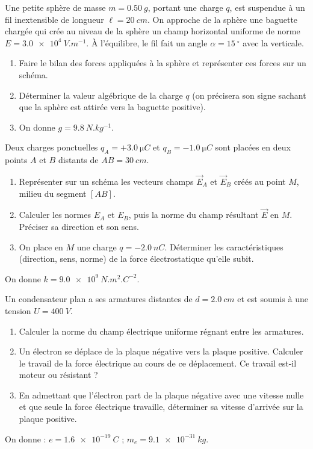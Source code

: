 \documentclass[11pt]{article}
\providecommand{\degree}{^{\circ}}
\newcounter{popsec}
\newcounter{popsub}
\newcommand{\courssub}[1]{%
  \stepcounter{popsub}%
  \par\vspace{9pt}\noindent{\popxbold\fontsize{11.5}{13}\selectfont\color{popink}{\color{poporange}\thepopsec.\thepopsub}\hspace{6pt}#1}\par\nopagebreak\vspace{4pt}
}
\begin{document}
\courssub{Je m'entraîne}

\begin{exercice}
Une petite sphère de masse $m = \SI{0,50}{g}$, portant une charge $q$, est suspendue à un fil inextensible de longueur $\ell = \SI{20}{cm}$. On approche de la sphère une baguette chargée qui crée au niveau de la sphère un champ horizontal uniforme de norme $E = \SI{3,0e4}{V.m^{-1}}$. À l'équilibre, le fil fait un angle $\alpha = \SI{15}{\degree}$ avec la verticale.
\begin{enumerate}
\item Faire le bilan des forces appliquées à la sphère et représenter ces forces sur un schéma.
\item Déterminer la valeur algébrique de la charge $q$ (on précisera son signe sachant que la sphère est attirée vers la baguette positive).
\item On donne $g = \SI{9,8}{N.kg^{-1}}$.
\end{enumerate}
\end{exercice}

\begin{exercice}
Deux charges ponctuelles $q_A = +\SI{3,0}{\micro C}$ et $q_B = -\SI{1,0}{\micro C}$ sont placées en deux points $A$ et $B$ distants de $AB = \SI{30}{cm}$.
\begin{enumerate}
\item Représenter sur un schéma les vecteurs champs $\vec{E}_A$ et $\vec{E}_B$ créés au point $M$, milieu du segment $[AB]$.
\item Calculer les normes $E_A$ et $E_B$, puis la norme du champ résultant $\vec{E}$ en $M$. Préciser sa direction et son sens.
\item On place en $M$ une charge $q = -\SI{2,0}{nC}$. Déterminer les caractéristiques (direction, sens, norme) de la force électrostatique qu'elle subit.
\end{enumerate}
On donne $k = \SI{9,0e9}{N.m^2.C^{-2}}$.
\end{exercice}

\begin{exercice}
Un condensateur plan a ses armatures distantes de $d = \SI{2,0}{cm}$ et est soumis à une tension $U = \SI{400}{V}$.
\begin{enumerate}
\item Calculer la norme du champ électrique uniforme régnant entre les armatures.
\item Un électron se déplace de la plaque négative vers la plaque positive. Calculer le travail de la force électrique au cours de ce déplacement. Ce travail est-il moteur ou résistant ?
\item En admettant que l'électron part de la plaque négative avec une vitesse nulle et que seule la force électrique travaille, déterminer sa vitesse d'arrivée sur la plaque positive.
\end{enumerate}
On donne : $e = \SI{1,6e-19}{C}$ ; $m_e = \SI{9,1e-31}{kg}$.
\end{exercice}
\end{document}
